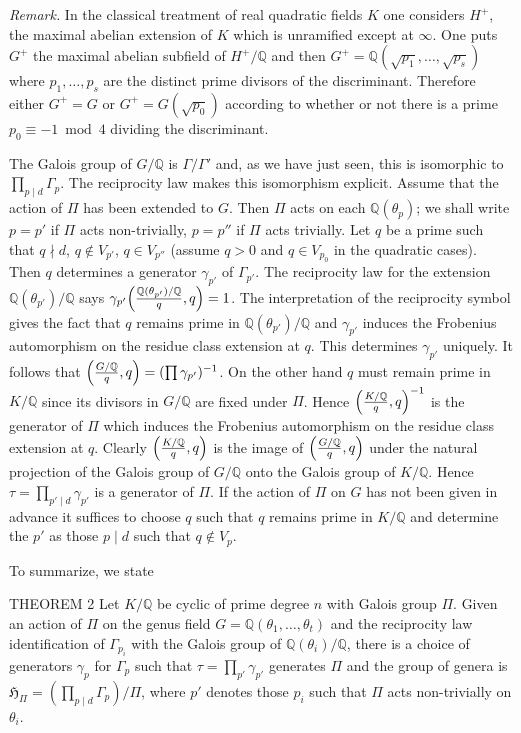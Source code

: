 \noindent\emph{Remark.} In the classical treatment of real quadratic
fields $K$ one considers $H^{+}$, the maximal abelian extension of $K$
which is unramified except at $\infty$. One puts $G^{+}$ the maximal
abelian subfield of $H^{+}/\mathbb{Q}$ and then
$G^{+}=\mathbb{Q}(\sqrt{p_{1}},\ldots,\sqrt{p_{s}})$ where
$p_{1},\ldots,p_{s}$ are the distinct prime divisors of the discriminant.
Therefore either $G^{+}=G$ or $G^{+}=G(\sqrt{p_{0}})$ according to
whether or not there is a prime $p_{0}\equiv -1\bmod 4$ dividing the
discriminant.

\medskip

The Galois group of $G/\mathbb{Q}$ is $\Gamma/\Gamma'$ and, as we have
just seen, this is isomorphic to $\prod_{p\mid d}\Gamma_{p}$. The
reciprocity law makes this isomorphism explicit. Assume that the action
of $\Pi$ has been extended to $G$. Then $\Pi$ acts on each
$\mathbb{Q}(\theta_{p})$; we shall write $p=p'$ if $\Pi$ acts
non-trivially, $p=p''$ if $\Pi$ acts trivially. Let $q$ be a prime such
that $q\nmid d$, $q\notin V_{p'}$, $q\in V_{p''}$ (assume $q>0$ and
$q\in V_{p_{0}}$ in the quadratic cases). Then $q$ determines a generator
$\gamma_{p'}$ of $\Gamma_{p'}$. The reciprocity law for the extension
$\mathbb{Q}(\theta_{p'})/\mathbb{Q}$ says
$\gamma_{p'}\Bigl(\frac{\mathbb{Q}(\theta_{p'})/\mathbb{Q}}{q},q\Bigr)=1$.
The interpretation of the reciprocity symbol gives the fact that $q$
remains prime in $\mathbb{Q}(\theta_{p'})/\mathbb{Q}$ and $\gamma_{p'}$
induces the Frobenius automorphism on the residue class extension at
$q$. This determines $\gamma_{p'}$ uniquely. It follows that
$\Bigl(\frac{G/\mathbb{Q}}{q},q\Bigr)=(\prod\gamma_{p'})^{-1}$. On the
other hand $q$ must remain prime in $K/\mathbb{Q}$ since its divisors in
$G/\mathbb{Q}$ are fixed under $\Pi$. Hence
$\Bigl(\frac{K/\mathbb{Q}}{q},q\Bigr)^{-1}$ is the generator of $\Pi$
which induces the Frobenius automorphism on the residue class extension
at $q$. Clearly $\Bigl(\frac{K/\mathbb{Q}}{q},q\Bigr)$ is the image of
$\Bigl(\frac{G/\mathbb{Q}}{q},q\Bigr)$ under the natural projection of
the Galois group of $G/\mathbb{Q}$ onto the Galois group of
$K/\mathbb{Q}$. Hence
$\tau=\prod_{p'\mid d}\gamma_{p'}$ is a generator of $\Pi$. If the action
of $\Pi$ on $G$ has not been given in advance it suffices to choose $q$
such that $q$ remains prime in $K/\mathbb{Q}$ and determine the $p'$ as
those $p\mid d$ such that $q\notin V_{p}$.

To summarize, we state

\begin{namedstmt}{THEOREM 2}
Let $K/\mathbb{Q}$ be cyclic of prime degree $n$ with Galois group $\Pi$.
Given an action of $\Pi$ on the genus field
$G=\mathbb{Q}(\theta_{1},\ldots,\theta_{t})$ and the reciprocity law
identification of $\Gamma_{p_{i}}$ with the Galois group of
$\mathbb{Q}(\theta_{i})/\mathbb{Q}$, there is a choice of generators
$\gamma_{p}$ for $\Gamma_{p}$ such that $\tau=\prod_{p'}\gamma_{p'}$
generates $\Pi$ and the group of genera is
$\mathfrak{H}_{\Pi}=(\prod_{p\mid d}\Gamma_{p})/\Pi$, where $p'$
denotes those $p_{i}$ such that $\Pi$ acts non-trivially on $\theta_{i}$.
\end{namedstmt}

